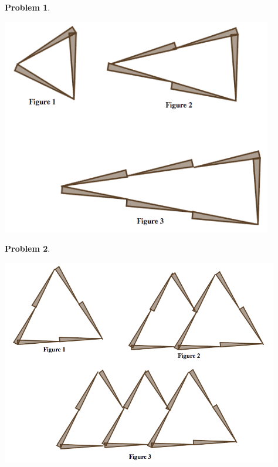 \documentclass[12pt, reqno]{amsart}
\theoremstyle{remark}
\theoremstyle{definition}
\newtheorem{problem}{Problem}
\numberwithin{equation}{section}  %
\begin{document}
\newpage

\begin{problem}\label{prob:toothpics2}\ 

\begin{center}
\includegraphics[height=9.5cm]{toothpicks2}
\end{center}

\end{problem}



\bigskip




\begin{problem}\label{prob:toothpics3}\ 

\begin{center}
\includegraphics[height=9cm]{toothpicks4}
\end{center}

\end{problem}
\end{document}
